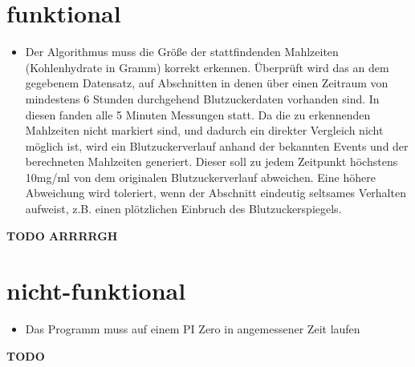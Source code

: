 \documentclass[accentcolor=tud0b,12pt,paper=a4]{tudreport}
\begin{document}
	\section{funktional}
\begin{itemize}
	\item Der Algorithmus muss die Größe der stattfindenden Mahlzeiten (Kohlenhydrate in Gramm) korrekt erkennen.  %
	 Überprüft wird das an dem gegebenem Datensatz, auf Abschnitten in denen über einen Zeitraum von mindestens 6 Stunden durchgehend Blutzuckerdaten vorhanden sind. In diesen fanden alle 5 Minuten Messungen statt. Da die zu erkennenden Mahlzeiten nicht markiert sind, und dadurch ein direkter Vergleich nicht möglich ist, wird ein Blutzuckerverlauf anhand der bekannten Events und der berechneten Mahlzeiten generiert. Dieser soll zu jedem Zeitpunkt höchstens 10mg/ml von dem originalen Blutzuckerverlauf abweichen. Eine höhere Abweichung wird toleriert, wenn der Abschnitt eindeutig seltsames Verhalten aufweist, z.B. einen plötzlichen Einbruch des Blutzuckerspiegels.
	

	
\end{itemize}
	\textbf{{\large TODO ARRRRGH}}
	
	\section{nicht-funktional}
\begin{itemize}
	\item Das Programm muss auf einem PI Zero in angemessener Zeit laufen
	
\end{itemize}
	\textbf{{\large TODO}}
	
\end{document}
